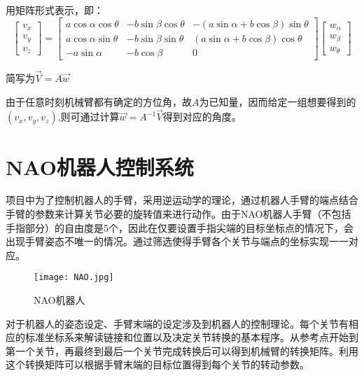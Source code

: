 \begin{enumerate}
用矩阵形式表示，即：
\begin{equation}
\left[ {\begin{array}{*{20}{c}}
	{{v_x}}\\
	{{v_y}}\\
	{{v_z}}
	\end{array}} \right] = \left[ {\begin{array}{*{20}{c}}
	{a\cos \alpha \cos \theta }&{ - b\sin \beta \cos \theta }&{ - (a\sin \alpha  + b\cos \beta )\sin \theta }\\
	{a\cos \alpha \sin \theta }&{ - b\sin \beta \sin \theta }&{(a\sin \alpha  + b\cos \beta )\cos \theta }\\
	{ - a\sin \alpha }&{ - b\cos \beta }&0
	\end{array}} \right]\left[ {\begin{array}{*{20}{c}}
	{{w_\alpha }}\\
	{{w_\beta }}\\
	{{w_\theta }}
	\end{array}} \right]
\end{equation}

简写为$\overrightarrow {V}  = {A}\overrightarrow w $

由于任意时刻机械臂都有确定的方位角，故$A$为已知量，因而给定一组想要得到的$(v_x,v_y,v_z)$,则可通过计算$\overrightarrow w=A^{-1}\overrightarrow {V}$得到对应的角度。
\end{enumerate}




\section{NAO机器人控制系统}
项目中为了控制机器人的手臂，采用逆运动学的理论，通过机器人手臂的端点结合手臂的参数来计算关节必要的旋转值来进行动作。由于NAO机器人手臂（不包括手指部分）的自由度是5个，因此在仅要设置手指尖端的目标坐标点的情况下，会出现手臂姿态不唯一的情况。通过筛选使得手臂各个关节与端点的坐标实现一一对应。

\begin{figure}[htbp]
\small
\centering
\texttt{[image: NAO.jpg]}
\caption{NAO机器人} 
\end{figure}

对于机器人的姿态设定、手臂末端的设定涉及到机器人的控制理论。每个关节有相应的标准坐标系来解读链接和位置以及决定关节转换的基本程序。从参考点开始到第一个关节，再最终到最后一个关节完成转换后可以得到机械臂的转换矩阵。利用这个转换矩阵可以根据手臂末端的目标位置得到每个关节的转动参数。

